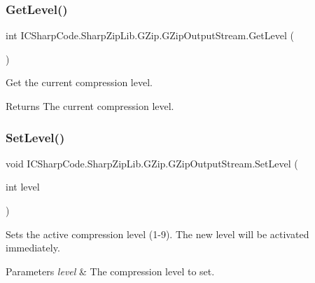 \subsubsection{\texorpdfstring{Get\+Level()}{GetLevel()}}
{\footnotesize\ttfamily int I\+C\+Sharp\+Code.\+Sharp\+Zip\+Lib.\+G\+Zip.\+G\+Zip\+Output\+Stream.\+Get\+Level (\begin{DoxyParamCaption}{ }\end{DoxyParamCaption})\hspace{0.3cm}{\ttfamily [inline]}}



Get the current compression level. 

\begin{DoxyReturn}{Returns}
The current compression level.
\end{DoxyReturn}
\mbox{\label{class_i_c_sharp_code_1_1_sharp_zip_lib_1_1_g_zip_1_1_g_zip_output_stream_aef311ac63321adbb56a01b3411b087f2}} 
\subsubsection{\texorpdfstring{Set\+Level()}{SetLevel()}}
{\footnotesize\ttfamily void I\+C\+Sharp\+Code.\+Sharp\+Zip\+Lib.\+G\+Zip.\+G\+Zip\+Output\+Stream.\+Set\+Level (\begin{DoxyParamCaption}\item[{int}]{level }\end{DoxyParamCaption})\hspace{0.3cm}{\ttfamily [inline]}}



Sets the active compression level (1-\/9). The new level will be activated immediately. 


\begin{DoxyParams}{Parameters}
{\em level} & The compression level to set.\\
\hline
\end{DoxyParams}

